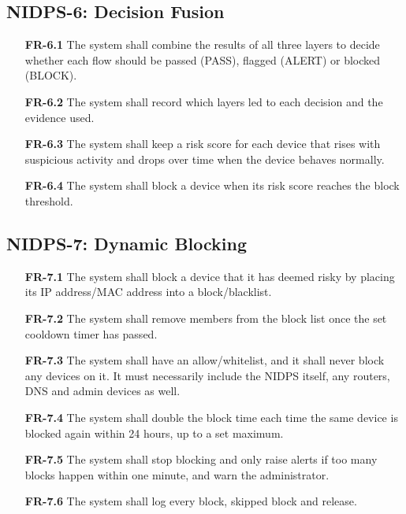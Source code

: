 \subsection{NIDPS-6: Decision Fusion}\label{sec:4.2.6}

\begin{itemize}[leftmargin=4.4em,labelwidth=3.9em,labelsep=0.5em,align=left]
\item[\hypertarget{req:FR-6.1}{\textbf{FR-6.1}}] The system shall combine the results of all three layers to decide whether each flow should be passed (PASS), flagged (ALERT) or blocked (BLOCK).
\item[\hypertarget{req:FR-6.2}{\textbf{FR-6.2}}] The system shall record which layers led to each decision and the evidence used.
\item[\hypertarget{req:FR-6.3}{\textbf{FR-6.3}}] The system shall keep a risk score for each device that rises with suspicious activity and drops over time when the device behaves normally.
\item[\hypertarget{req:FR-6.4}{\textbf{FR-6.4}}] The system shall block a device when its risk score reaches the block threshold.
\end{itemize}

\subsection{NIDPS-7: Dynamic Blocking}\label{sec:4.2.7}

\begin{itemize}[leftmargin=4.4em,labelwidth=3.9em,labelsep=0.5em,align=left]
\item[\hypertarget{req:FR-7.1}{\textbf{FR-7.1}}] The system shall block a device that it has deemed risky by placing its IP address/MAC address into a block/blacklist.
\item[\hypertarget{req:FR-7.2}{\textbf{FR-7.2}}] The system shall remove members from the block list once the set cooldown timer has passed.
\item[\hypertarget{req:FR-7.3}{\textbf{FR-7.3}}] The system shall have an allow/whitelist, and it shall never block any devices on it. It must necessarily include the NIDPS itself, any routers, DNS and admin devices as well.
\item[\hypertarget{req:FR-7.4}{\textbf{FR-7.4}}] The system shall double the block time each time the same device is blocked again within 24 hours, up to a set maximum.
\item[\hypertarget{req:FR-7.5}{\textbf{FR-7.5}}] The system shall stop blocking and only raise alerts if too many blocks happen within one minute, and warn the administrator.
\item[\hypertarget{req:FR-7.6}{\textbf{FR-7.6}}] The system shall log every block, skipped block and release.
\end{itemize}

